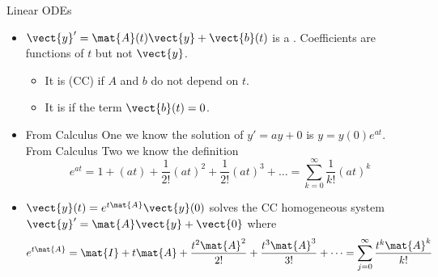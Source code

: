 \begin{frame}{Linear ODEs}
\begin{itemize}
  \item 
  $\vect{y}'=\mat{A}(t)\vect{y}+\vect{b}(t)$
  is a . Coefficients are functions of $t$ but not $\vect{y}$.
  \begin{itemize}
  	\item It is  (CC) if
  	 $A$ and $b$ do not depend on $t$.  
  	 \item It is  if the  term $\vect{b}(t)=0$.
  \end{itemize}
  \item From Calculus One we know the solution of $y'=ay+0$ is $y=y(0) e^{at}$. From Calculus Two we know the definition
  \[
  e^{at} = 1 + (at)+ \frac{1}{2!} (a t)^2 + \frac{1}{2!} (at)^3 + \dots = \sum_{k=0}^\infty \frac{1}{k!} (at)^k
  \]
  \item $\vect{y}(t)=e^{t\mat{A}} \vect{y}(0)$ solves the 
  CC  homogeneous system
  $\vect{y}'=\mat{A}\vect{y}+\vect{0}$ where
   \[
  e^{t\mat{A}}=\mat{I}+t\mat{A}
  +\frac{t^2\mat{A}^2}{2!}+\frac{t^3\mat{A}^3}{3!}+\cdots
  =\sum_{j=0}^{\infty}\frac{t^k\mat{A}^k}{k!}
  \]
\end{itemize}
\end{frame}